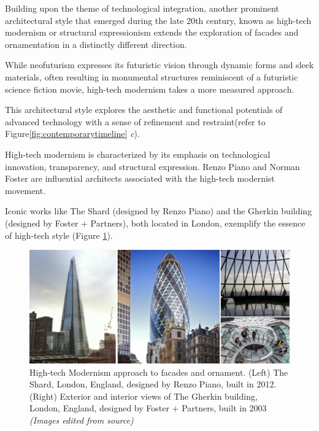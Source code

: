 
Building upon the theme of technological integration, another prominent architectural style that emerged during the late 20th century, known as high-tech modernism or structural expressionism extends the exploration of facades and ornamentation in a distinctly different direction.

While neofuturism expresses its futuristic vision through dynamic forms and sleek materials, often resulting in monumental structures reminiscent of a futuristic science fiction movie, high-tech modernism takes a more measured approach.

This architectural style explores the aesthetic and functional potentials of advanced technology with a sense of refinement and restraint(refer to Figure\ref{fig:contemporarytimeline} \textit{c}).

High-tech modernism is characterized by its emphasis on technological innovation, transparency, and structural expression.
Renzo Piano and Norman Foster are influential architects associated with the high-tech modernist movement\cite{Tyc2018}.

Iconic works like The Shard (designed by Renzo Piano) and the Gherkin building (designed by Foster + Partners), both located in London, exemplify the essence of high-tech style (Figure \ref{fig:hightechmodernism}).

     \begin{figure}[htb]
          \centering
          \includegraphics[width= \linewidth]{Images/hightechmodernism}
          \caption{High-tech Modernism approach to facades and ornament. (Left) The Shard, London, England, designed by Renzo Piano, built in 2012. (Right) Exterior and interior views of The Gherkin building, London, England, designed by  Foster + Partners, built in 2003 \textit{(Images edited from source)}}
          \label{fig:hightechmodernism}
        \end{figure}

